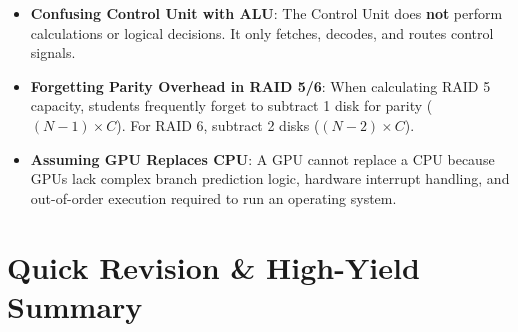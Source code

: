 \begin{commonmistake}
\begin{itemize}
    \item \textbf{Confusing Control Unit with ALU}: The Control Unit does \textbf{not} perform calculations or logical decisions. It only fetches, decodes, and routes control signals.
    \item \textbf{Forgetting Parity Overhead in RAID 5/6}: When calculating RAID 5 capacity, students frequently forget to subtract 1 disk for parity ($(N-1)\times C$). For RAID 6, subtract 2 disks ($(N-2)\times C$).
    \item \textbf{Assuming GPU Replaces CPU}: A GPU cannot replace a CPU because GPUs lack complex branch prediction logic, hardware interrupt handling, and out-of-order execution required to run an operating system.
\end{itemize}
\end{commonmistake}

\section{Quick Revision \& High-Yield Summary}


